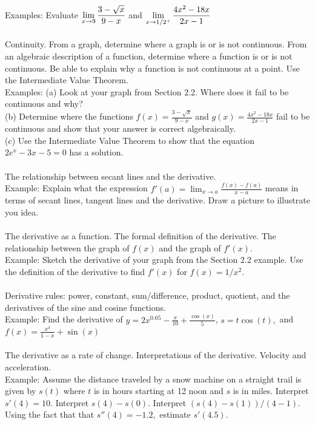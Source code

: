 \documentclass[11pt,fleqn]{article}
\begin{document}
\noindent Examples: Evaluate $\displaystyle \lim_{x \to 9} \frac{3-\sqrt{x}}{9-x}$ and $\displaystyle \lim_{x \to 1/2^+} \frac{4x^2-18x}{2x-1}$\\

\noindent {}\\
Continuity. From a graph, determine where a graph is or is not continuous. From an algebraic description of a function, determine where a function is or is not continuous. Be able to explain why a function is not continuous at a point. Use the Intermediate Value Theorem.\\

\noindent Examples: 
(a) Look at your graph from Section 2.2. Where does it fail to be continuous and why? \\
(b) Determine where the functions $f(x)= \frac{3-\sqrt{x}}{9-x}$ and $g(x)=  \frac{4x^2-18x}{2x-1}$ fail to be continuous and show that your answer is correct algebraically.\\
(c) Use the Intermediate Value Theorem to show that the equation $2e^x-3x-5=0$ has a solution.\\

\noindent {}\\
The relationship between secant lines and the derivative.\\

\noindent Example: Explain what the expression $f'(a) = \lim_{x \to a} \frac{f(x)-f(a)}{x-a}$ means in terms of secant lines, tangent lines and the derivative. Draw a picture to illustrate you idea.\\

\noindent {}\\
The derivative as a function. The formal definition of the derivative. The relationship between the graph of $f(x)$ and the graph of $f'(x).$\\

\noindent Example: Sketch the derivative of your graph from the Section 2.2 example. Use the definition of the derivative to find $f'(x)$ for $f(x)=1/x^2.$\\

\noindent {}\\
Derivative rules: power, constant, sum/difference, product, quotient, and the derivatives of the sine and cosine functions.\\

\noindent Example: Find the derivative of $y=2x^{0.05}-\frac{x}{10}+\frac{\cos(x)}{5}$, $s=t\cos(t),$ and $f(x)=\frac{x^3}{1-x}+ \sin(x)$\\

\noindent {}\\
The derivative as a rate of change. Interpretations of the derivative. Velocity and acceleration.\\

\noindent Example: Assume the distance traveled by a snow machine on a straight trail is given by $s(t)$ where $t$ is in hours starting at 12 noon and $s$ is in miles. Interpret $s'(4)=10.$ Interpret $s(4)-s(0).$ Interpret $(s(4)-s(1))/(4-1).$ Using the fact that that $s''(4)=-1.2,$ estimate $s'(4.5).$
\end{document}
